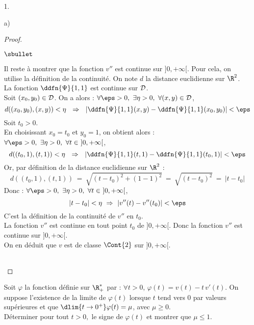 \begin{noliste}{1.}
\begin{noliste}{a)}
\begin{proof}
\begin{remark}
\begin{noliste}{$\sbullet$}
      \item Il reste à montrer que la fonction $v''$ est 
      continue sur $]0,+\infty[$. Pour cela, on utilise la 
      définition de la continuité.
      On note $d$ la distance euclidienne sur $\R^2$.\\
      La fonction $\ddfn{\Psi}{1,1}$ est continue sur ${\cal D}$.\\
      Soit $(x_0,y_0)\in {\cal D}$. On a alors :
      $\forall \eps >0, \ \exists \eta >0, \ \forall (x,y) \in 
       {\cal D}$,
      \[
        d((x_0,y_0),(x,y)) < \eta \ \ \Rightarrow \ \
       \vert \ddfn{\Psi}{1,1}(x,y) - \ddfn{\Psi}{1,1}(x_0,y_0) \vert
       < \eps
      \]
      Soit $t_0>0$.\\
      En choisissant $x_0=t_0$ et $y_0=1$, on obtient alors :
      $\forall \eps >0, \ \exists \eta >0, \ \forall t \in 
       \ ]0,+\infty[$,
      \[
        d((t_0,1),(t,1)) < \eta \ \ \Rightarrow \ \
       \vert \ddfn{\Psi}{1,1}(t,1) - \ddfn{\Psi}{1,1}(t_0,1) \vert
       < \eps
      \]
      Or, par définition de la distance euclidienne sur $\R^2$ :
      \[
       d((t_0,1),(t,1)) \ = \ \sqrt{(t-t_0)^2 + (1-1)^2}
       \ = \ \sqrt{(t-t_0)^2} \ = \ \vert t-t_0 \vert
      \]
      Donc :
      $\forall \eps >0, \ \exists \eta >0, \ \forall t \in 
       \ ]0,+\infty[$,
      \[
        \vert t - t_0 \vert < \eta \ \Rightarrow \
       \vert v''(t) - v''(t_0) \vert
       < \eps
      \]
      C'est la définition de la continuité de $v''$ en $t_0$.\\
      La fonction $v''$ est continue en tout point $t_0$ de 
      $]0,+\infty[$. Donc la fonction $v''$ est continue 
      sur $]0,+\infty[$.\\
      On en déduit que $v$ est de classe $\Cont{2}$ sur 
      $]0,+\infty[$.
    \end{noliste}
   \end{remark}~\\[-1.4cm]
  \end{proof}

  
  
  
  \newpage
  
  
  
  
  \item Soit $\varphi$ la fonction définie sur $\R_+^*$ par : $\forall 
  t >0$, $\varphi(t)=v(t)-t \, v'(t)$. On suppose l'existence de la 
  limite de $\varphi(t)$ lorsque $t$ tend vers 0 par valeurs supérieures
  et que $\dlim{t \to 0^+} \varphi(t)=\mu$, avec $\mu \geq 0$.\\
  Déterminer pour tout $t>0,$ le signe de $\varphi(t)$ et montrer que 
  $\mu \leq 1$.
  

\end{noliste}
\end{noliste}

